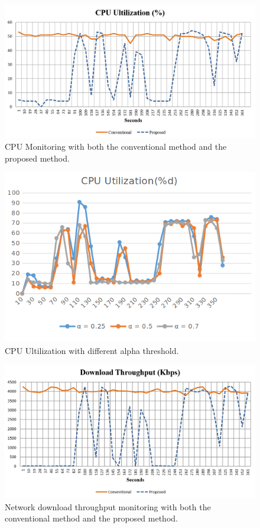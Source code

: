 \begin{figure}
\centering
\includegraphics[scale=0.7]{Figures/cpu.png}
\caption{CPU Monitoring with both the conventional method and the proposed method.}
\label{fig:cpu}
\end{figure}
\begin{figure}
\centering
\includegraphics[scale=0.7]{Figures/cpu_utilization.png}
\caption{CPU Ultilization with different alpha threshold.}
\label{fig:cpu_ultilization}
\end{figure}
\begin{figure}
\centering
\includegraphics[scale=0.7]{Figures/network.png}
\caption{Network download throughput monitoring with both the conventional method and the proposed method.}
\label{fig:network}
\end{figure}

